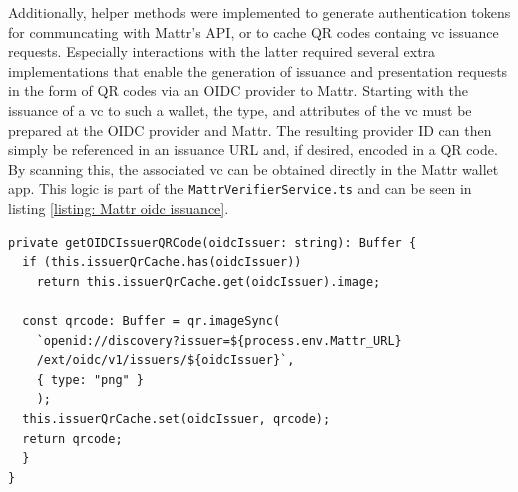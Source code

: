    Additionally, helper methods were implemented to generate authentication tokens for communcating with Mattr's API, or to cache QR codes containg \ac{vc} issuance requests. Especially interactions with the latter required several extra implementations that enable the generation of issuance and presentation requests in the form of QR codes via an OIDC provider to Mattr. Starting with the issuance of a \ac{vc} to such a wallet, the type, and attributes of the \ac{vc} must be prepared at the OIDC provider and Mattr. The resulting provider ID can then simply be referenced in an issuance URL and, if desired, encoded in a QR code. By scanning this, the associated \ac{vc} can be obtained directly in the Mattr wallet app. This logic is part of the \texttt{MattrVerifierService.ts} and can be seen in listing \ref{listing: Mattr oidc issuance}.
    \newline
    
\begin{lstlisting}[style=ES6, caption=\ac{OIDC} issuance QR code generation, label={listing: Mattr oidc issuance}]
private getOIDCIssuerQRCode(oidcIssuer: string): Buffer {
  if (this.issuerQrCache.has(oidcIssuer)) 
    return this.issuerQrCache.get(oidcIssuer).image;

  const qrcode: Buffer = qr.imageSync(
    `openid://discovery?issuer=${process.env.Mattr_URL}
    /ext/oidc/v1/issuers/${oidcIssuer}`,
    { type: "png" }
    );
  this.issuerQrCache.set(oidcIssuer, qrcode);
  return qrcode;
  }
}\end{lstlisting}


